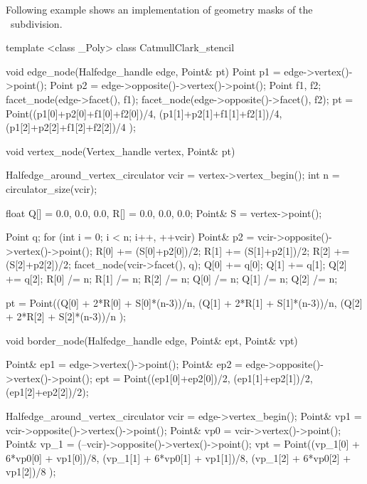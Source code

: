 
Following example shows an implementation of geometry masks 
of the \CC\ subdivision.

\begin{ccExampleCode}
template <class _Poly>
class CatmullClark_stencil {
   void edge_node(Halfedge_handle edge, Point& pt) {
    Point p1 = edge->vertex()->point();
    Point p2 = edge->opposite()->vertex()->point();
    Point f1, f2;
    facet_node(edge->facet(), f1);
    facet_node(edge->opposite()->facet(), f2);
    pt = Point((p1[0]+p2[0]+f1[0]+f2[0])/4,
               (p1[1]+p2[1]+f1[1]+f2[1])/4,
               (p1[2]+p2[2]+f1[2]+f2[2])/4 );
  }
 
  void vertex_node(Vertex_handle vertex, Point& pt) {
    Halfedge_around_vertex_circulator vcir = vertex->vertex_begin();
    int n = circulator_size(vcir);    

    float Q[] = {0.0, 0.0, 0.0}, R[] = {0.0, 0.0, 0.0};
    Point& S = vertex->point();
    
    Point q;
    for (int i = 0; i < n; i++, ++vcir) {
      Point& p2 = vcir->opposite()->vertex()->point();
      R[0] += (S[0]+p2[0])/2;
      R[1] += (S[1]+p2[1])/2;
      R[2] += (S[2]+p2[2])/2;
      facet_node(vcir->facet(), q);
      Q[0] += q[0];      
      Q[1] += q[1];      
      Q[2] += q[2];
    }
    R[0] /= n;    R[1] /= n;    R[2] /= n;
    Q[0] /= n;    Q[1] /= n;    Q[2] /= n;
      
    pt = Point((Q[0] + 2*R[0] + S[0]*(n-3))/n,
               (Q[1] + 2*R[1] + S[1]*(n-3))/n,
               (Q[2] + 2*R[2] + S[2]*(n-3))/n );
  }

  void border_node(Halfedge_handle edge, Point& ept, Point& vpt) {
    Point& ep1 = edge->vertex()->point();
    Point& ep2 = edge->opposite()->vertex()->point();
    ept = Point((ep1[0]+ep2[0])/2, (ep1[1]+ep2[1])/2, (ep1[2]+ep2[2])/2);

    Halfedge_around_vertex_circulator vcir = edge->vertex_begin();
    Point& vp1  = vcir->opposite()->vertex()->point();
    Point& vp0  = vcir->vertex()->point();
    Point& vp_1 = (--vcir)->opposite()->vertex()->point();
    vpt = Point((vp_1[0] + 6*vp0[0] + vp1[0])/8,
                (vp_1[1] + 6*vp0[1] + vp1[1])/8,
                (vp_1[2] + 6*vp0[2] + vp1[2])/8 );
  }
}
\end{ccExampleCode}

